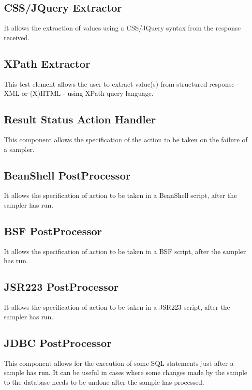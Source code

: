 \documentclass[12pt]{book}
\begin{document}
  \subsection{CSS/JQuery Extractor}
  It allows the extraction of values using a CSS/JQuery syntax from the response received.
  
  \subsection{XPath Extractor}
  This test element allows the user to extract value(s) from structured response - XML or (X)HTML - using XPath query language.
  
  \subsection{Result Status Action Handler}
  This component allows the specification of the action to be taken on the failure of a sampler.
  
  \subsection{BeanShell PostProcessor}
  It allows the specification of action to be taken in a BeanShell script, after the sampler has run.
  
  \subsection{BSF PostProcessor}
  It allows the specification of action to be taken in a BSF script, after the sampler has run.
  
  \subsection{JSR223 PostProcessor}
  It allows the specification of action to be taken in a JSR223 script, after the sampler has run.
  
  \subsection{JDBC PostProcessor}
  This component allows for the execution of some SQL statements just after a sample has run.
  It can be useful in cases where some changes made by the sample to the database needs to be undone after the sample has processed.
  
\end{document}

